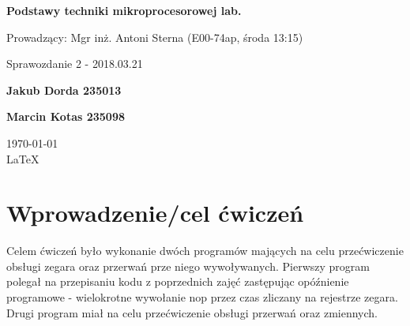 \documentclass[12pt,a4paper]{article}
\begin{document}
	
	\begin{titlepage}
		
		\centering
		{\huge\bfseries Podstawy techniki mikroprocesorowej lab.\par}
		
		\vspace{0.5cm}
		Prowadzący: Mgr inż. Antoni Sterna (E00-74ap, środa 13:15) \\
	
		\vspace{1.1cm}
		{\Large Sprawozdanie 2 - 2018.03.21\par}
		\vfill
		
		{\large\bfseries Jakub Dorda 235013\par}
		{\large\bfseries Marcin Kotas 235098\par}
		
		\vspace{1cm}
		\today \\ \LaTeX
		
		\restoregeometry
	\end{titlepage}


	\section{Wprowadzenie/cel ćwiczeń}
		Celem ćwiczeń było wykonanie dwóch programów mających na celu przećwiczenie obsługi zegara oraz przerwań prze niego wywoływanych. Pierwszy program polegał na przepisaniu kodu z poprzednich zajęć zastępując opóźnienie programowe - wielokrotne wywołanie nop przez czas zliczany na rejestrze zegara. Drugi program miał na celu przećwiczenie obsługi przerwań oraz zmiennych.
		
\end{document}
